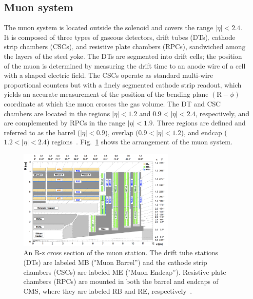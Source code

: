 \subsection*{Muon system}
The muon system is located outside the solenoid and covers the range $|\eta|<2.4$. It is composed of three types of gaseous detectors, drift tubes (DTs), cathode strip chambers (CSCs), and resistive plate chambers (RPCs), sandwiched among the layers of the steel yoke. 
The DTs are segmented into drift cells; the position of the muon is determined by measuring the drift time to an anode wire of a cell with a shaped electric field. 
The CSCs operate as standard multi-wire proportional counters but with a finely segmented cathode strip readout, which yields an accurate measurement of the position of the bending plane $(\text{R}-\phi)$ coordinate at which the muon crosses the gas volume. 
The DT and CSC chambers are located in the regions $|\eta| < 1.2$ and $0.9 < |\eta| < 2.4$, respectively, and are complemented by RPCs in the range $|\eta| < 1.9$. Three regions are defined and referred to as the barrel ($|\eta| < 0.9$), overlap ($0.9 < |\eta| < 1.2$), and endcap ($1.2 < |\eta| < 2.4$) regions~\cite{Sirunyan:2018fpa}. 
Fig.~\ref{fig:MuonSystLayout} shows the arrangement of the muon system. 
\begin{figure}[!ht]
  \begin{center}
  \includegraphics[width=0.7\textwidth]{Fig/CMS_Detector/MuonSystem_layout}
    \caption{An R-z cross section of the muon station. The drift tube stations (DTs) are labeled MB ("Muon Barrel'') and the cathode strip chambers (CSCs) are labeled ME ("Muon Endcap''). Resistive plate chambers (RPCs) are mounted in both the barrel and endcaps of CMS, where they are labeled RB and RE, respectively~\cite{Sirunyan:2018fpa}. \label{fig:MuonSystLayout}}
  \end{center}
\end{figure}

